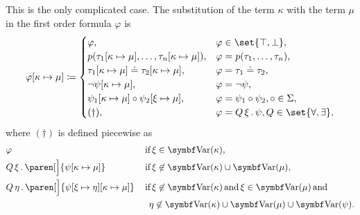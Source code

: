 \begin{definition}
\begin{defenum}
     This is the only complicated case. The substitution of the term \( \kappa \) with the term \( \mu \) in the first order formula \( \varphi \) is
    \begin{equation}\label{eq:def:first_order_substitution/term_in_formula}
      \varphi[\kappa \mapsto \mu] \coloneqq \begin{cases}
        \varphi,                                                           &\varphi \in \set{ \top, \bot }, \\
        p(\tau_1[\kappa \mapsto \mu], \ldots, \tau_n[\kappa \mapsto \mu]), &\varphi = p(\tau_1, \ldots, \tau_n), \\
        \tau_1[\kappa \mapsto \mu] \doteq \tau_2[\kappa \mapsto \mu],      &\varphi = \tau_1 \doteq \tau_2, \\
        \neg \psi[\kappa \mapsto \mu],                                     &\varphi = \neg \psi, \\
        \psi_1[\kappa \mapsto \mu] \circ \psi_2[\xi \mapsto \mu],          &\varphi = \psi_1 \circ \psi_2, \circ \in \Sigma, \\
        (\dagger),                                                         &\varphi = \quantifier{Q}{\xi} \psi, Q \in \set{ \forall, \exists },
      \end{cases}
    \end{equation}
    where \( (\dagger) \) is defined piecewise as
    \begin{align}
      &\varphi                                                                    &&\T{if} \xi \in \bfop{Var}(\kappa), \label{eq:def:first_order_substitution/term_in_formula/quantifiers/trivial} \\
      &\quantifier{Q}{\xi} \paren[\Big]{\psi[\kappa \mapsto \mu]}                    &&\T{if} \xi \not\in \bfop{Var}(\kappa) \cup \bfop{Var}(\mu), \label{eq:def:first_order_substitution/term_in_formula/quantifiers/direct} \\
      &\quantifier{Q}{\eta} \paren[\Big]{\psi[\xi \mapsto \eta][\kappa \mapsto \mu]} &&\T{if} \xi \not\in \bfop{Var}(\kappa) \T{and} \xi \in \bfop{Var}(\mu) \T{and} \label{eq:def:first_order_substitution/term_in_formula/quantifiers/renaming} \\
                                                                                  &&&\phantom{\T{if}} \eta \not\in \bfop{Var}(\kappa) \cup \bfop{Var}(\mu) \cup \bfop{Var}(\psi). \nonumber
    \end{align}


\end{defenum}
\end{definition}
